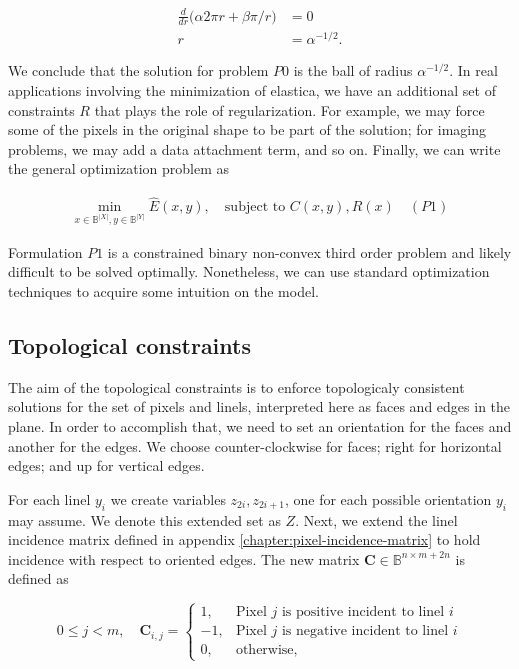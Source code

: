 \begin{align*}
	\frac{d}{dr}\big( \alpha 2\pi r + \beta \pi/r \big) &= 0\\
	r &= \alpha^{-1/2}.
\end{align*}  

We conclude that the solution for problem $P0$ is the ball of radius $\alpha^{-1/2}$. In real applications involving the minimization of elastica, we have an additional set of constraints $R$ that plays the role of regularization. For example, we may force some of the pixels in the original shape to be part of the solution; for imaging problems, we may add a data attachment term, and so on. Finally, we can write the general optimization problem as

\begin{align*}
	\min_{x \in \mathbb{B}^{|X|}, y \in \mathbb{B}^{|Y|}}{\hat{E}(x,y)}, \quad \text{subject to } C(x,y), R(x) \quad (P1)
\end{align*}

	Formulation $P1$ is a constrained binary non-convex third order problem and likely difficult to be solved optimally. Nonetheless, we can use standard optimization techniques to acquire some intuition on the model. 	
	
\subsection{Topological constraints}



The aim of the topological constraints is to enforce topologicaly consistent solutions for the set of pixels and linels, interpreted here as faces and edges in the plane. In order to accomplish that, we need to set an orientation for the faces and another for the edges. We choose counter-clockwise for faces; right for horizontal edges; and up for vertical edges.


For each linel $y_i$ we create variables $z_{2i},z_{2i+1}$, one for each possible orientation $y_i$ may assume. We denote this extended set as $Z$. Next, we extend the linel incidence matrix defined in appendix \ref{chapter:pixel-incidence-matrix} to hold incidence with respect to oriented edges. The new matrix $\mathbf{C} \in \mathbb{B}^{n \times m + 2n}$ is defined as

\[
	0 \leq j < m, \quad \mathbf{C}_{i,j} = \left\{ \begin{array}{ll}
	
	1,& \text{Pixel $j$ is positive incident to linel $i$}\\
	-1,& \text{Pixel $j$ is negative incident to linel $i$}\\	
	0,& \text{otherwise},
	\end{array}\right.
\]

